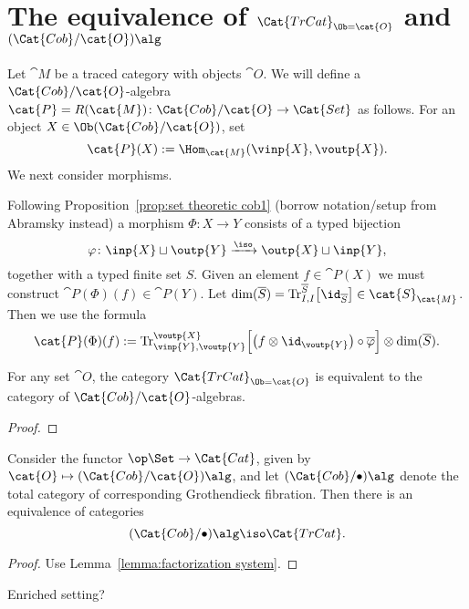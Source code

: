 \section{The equivalence of $\Cat{TrCat}_{\Ob=\cat{O}}$ and $(\Cat{Cob}/\cat{O})\alg$}\label{sec:first equivalence}

Let $\cat{M}$ be a traced category with objects $\cat{O}$. We will define a $\Cat{Cob}/\cat{O}$-algebra $\cat{P}=R(\cat{M})\colon\Cat{Cob}/\cat{O}\to\Cat{Set}$ as follows. For an object $X\in\Ob(\Cat{Cob}/\cat{O})$, set 
$$\cat{P}(X):=\Hom_{\cat{M}}(\vinp{X},\voutp{X}).$$
We next consider morphisms.

Following Proposition~\ref{prop:set theoretic cob1} (borrow notation/setup from Abramsky instead) a morphism $\Phi\colon X\longrightarrow Y$ consists of a typed bijection 
$$\varphi\colon\inp{X}\sqcup \outp{Y}\xrightarrow{\iso}\outp{X}\sqcup \inp{Y},$$ 
together with a typed finite set $S$. Given an element $f\in\cat{P}(X)$ we must construct $\cat{P}(\Phi)(f)\in\cat{P}(Y)$. Let $\dim(\overline{S})=\textnormal{Tr}^{\overline{S}}_{I,I}\big[\id_{\overline{S}}\big]\in\cat{S}_\cat{M}$. Then we use the formula
$$\cat{P}(\Phi)(f):=
\textnormal{Tr}^{\voutp{X}}_{\vinp{Y},\voutp{Y}}\Big[\big(f\otimes\id_{\voutp{Y}}\big)\circ\overline{\varphi}\Big]
\otimes\dim(\overline{S}).	
$$

\begin{theorem}
 For any set $\cat{O}$, the category $\Cat{TrCat}_{\Ob=\cat{O}}$ is equivalent to the category of $\Cat{Cob}/\cat{O}$-algebras.
\end{theorem}
\begin{proof}
 
\end{proof}

\begin{corollary}\label{cor:traced as cob-alg}

Consider the functor $\op\Set\to\Cat{Cat}$, given by $\cat{O}\mapsto(\Cat{Cob}/\cat{O})\alg$, and let $(\Cat{Cob}/\bullet)\alg$ denote the total category of corresponding Grothendieck fibration. Then there is an equivalence of categories
$$(\Cat{Cob}/\bullet)\alg\iso\Cat{TrCat}.$$

\end{corollary}

\begin{proof}

Use Lemma~\ref{lemma:factorization system}.

\end{proof}

\begin{corollary}
 Enriched setting?
\end{corollary}

